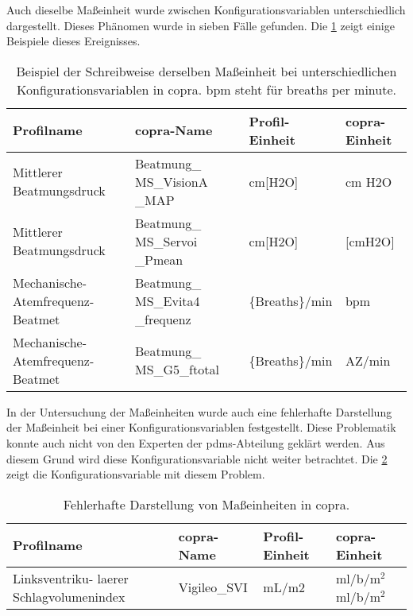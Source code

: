 Auch dieselbe Maßeinheit wurde zwischen Konfigurationsvariablen unterschiedlich dargestellt. Dieses Phänomen wurde in sieben Fälle gefunden. Die \ref{tab:unitscopra} zeigt einige Beispiele dieses Ereignisses.

\clearpage

\begin{table}[ht]
	\centering
	\caption[Beispiel der Schreibweise derselben Maßeinheit in \acs{copra}]{Beispiel der Schreibweise derselben Maßeinheit bei unterschiedlichen Konfigurationsvariablen in \acs{copra}. bpm steht für \glqq breaths per minute\grqq{}.}
	\label{tab:unitscopra}
	\begin{tabular}{|p{3cm}|p{3cm}|l|l|} \hline
		\bfseries Profilname & \bfseries \ac{copra}-Name & \bfseries Profil-Einheit &  \bfseries \ac{copra}-Einheit \\ \hline
		Mittlerer Beatmungsdruck & Beatmung\_ MS\_VisionA \_MAP & cm[H2O] & cm H2O \\ \hline
		Mittlerer Beatmungsdruck & Beatmung\_ MS\_Servoi \_Pmean & cm[H2O] & [cmH2O] \\ \hline \hline
		Mechanische-Atemfrequenz-Beatmet & Beatmung\_ MS\_Evita4 \_frequenz & \{Breaths\}/min & bpm \\ \hline
		Mechanische-Atemfrequenz-Beatmet & Beatmung\_ MS\_G5\_ftotal & \{Breaths\}/min & AZ/min \\ \hline
	\end{tabular}
\end{table}

In der Untersuchung der Maßeinheiten wurde auch eine fehlerhafte Darstellung der Maßeinheit bei einer Konfigurationsvariablen festgestellt. Diese Problematik konnte auch nicht von den Experten der \ac{pdms}-Abteilung geklärt werden. Aus diesem Grund wird diese Konfigurationsvariable nicht weiter betrachtet. Die \ref{tab:errounit} zeigt die Konfigurationsvariable mit diesem Problem.


\begin{table}[ht]
	\centering
	\caption[Fehlerhafte Darstellung von Maßeinheiten in \acs{copra}]{Fehlerhafte Darstellung von Maßeinheiten in \acs{copra}.}
	\label{tab:errounit}
	\begin{tabular}{|p{3cm}|p{3cm}|l|l|} \hline
		\bfseries Profilname & \bfseries \ac{copra}-Name & \bfseries Profil-Einheit & \bfseries \ac{copra}-Einheit \\ \hline
		Linksventriku- laerer Schlagvolumenindex & Vigileo\_SVI & mL/m2 & ml/b/m$^2$ml/b/m$^2$ \\ \hline
	\end{tabular}
\end{table}

